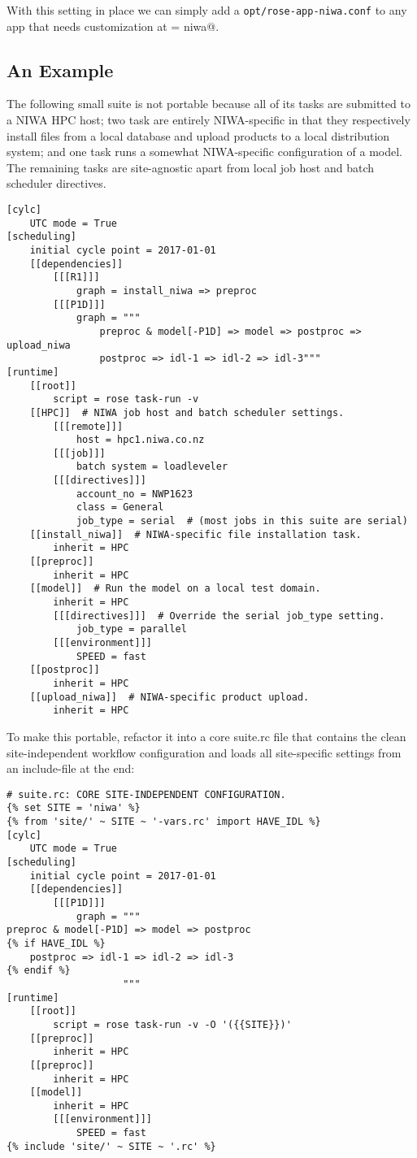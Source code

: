 With this setting in place we can simply add a
\lstinline=opt/rose-app-niwa.conf= to any app that needs customization at
\lstinline@SITE = niwa@.

\subsection{An Example}

The following small suite is not portable because all of its tasks are
submitted to a NIWA HPC host; two task are entirely NIWA-specific in that they 
respectively install files from a local database and upload products to a local
distribution system; and one task runs a somewhat NIWA-specific configuration
of a model. The remaining tasks are site-agnostic apart from local job host
and batch scheduler directives.

\lstset{language=suiterc}
\begin{lstlisting}
[cylc]
    UTC mode = True
[scheduling]
    initial cycle point = 2017-01-01
    [[dependencies]]
        [[[R1]]]
            graph = install_niwa => preproc
        [[[P1D]]]
            graph = """
                preproc & model[-P1D] => model => postproc => upload_niwa
                postproc => idl-1 => idl-2 => idl-3"""
[runtime]
    [[root]]
        script = rose task-run -v
    [[HPC]]  # NIWA job host and batch scheduler settings.
        [[[remote]]]
            host = hpc1.niwa.co.nz
        [[[job]]]
            batch system = loadleveler
        [[[directives]]]
            account_no = NWP1623
            class = General
            job_type = serial  # (most jobs in this suite are serial)
    [[install_niwa]]  # NIWA-specific file installation task.
        inherit = HPC
    [[preproc]]
        inherit = HPC
    [[model]]  # Run the model on a local test domain.
        inherit = HPC
        [[[directives]]]  # Override the serial job_type setting.
            job_type = parallel
        [[[environment]]]
            SPEED = fast
    [[postproc]]
        inherit = HPC
    [[upload_niwa]]  # NIWA-specific product upload.
        inherit = HPC
\end{lstlisting}

To make this portable, refactor it into a core suite.rc file that contains the
clean site-independent workflow configuration and loads all site-specific
settings from an include-file at the end:

\lstset{language=suiterc}
\begin{lstlisting}
# suite.rc: CORE SITE-INDEPENDENT CONFIGURATION.
{% set SITE = 'niwa' %}
{% from 'site/' ~ SITE ~ '-vars.rc' import HAVE_IDL %}
[cylc]
    UTC mode = True
[scheduling]
    initial cycle point = 2017-01-01
    [[dependencies]]
        [[[P1D]]]
            graph = """
preproc & model[-P1D] => model => postproc
{% if HAVE_IDL %}
    postproc => idl-1 => idl-2 => idl-3
{% endif %}
                    """
[runtime]
    [[root]]
        script = rose task-run -v -O '({{SITE}})'
    [[preproc]]
        inherit = HPC
    [[preproc]]
        inherit = HPC
    [[model]]
        inherit = HPC
        [[[environment]]]
            SPEED = fast
{% include 'site/' ~ SITE ~ '.rc' %}
\end{lstlisting}


